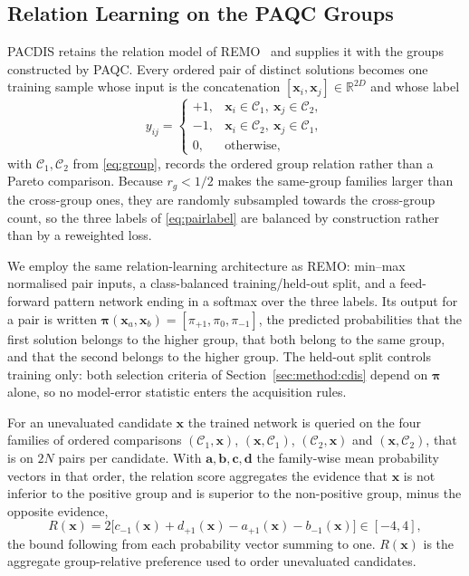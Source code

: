 \documentclass[final,5p,times,twocolumn]{elsarticle}
\newcommand{\vx}{\mathbf{x}}
\begin{document}
\subsection{Relation Learning on the PAQC Groups}
\label{sec:method:relation}

PACDIS retains the relation model of REMO~\cite{ref:remo} and supplies it
with the groups constructed by PAQC. Every ordered pair
of distinct solutions becomes one training sample whose input is the
concatenation $[\vx_i,\vx_j]\in\mathbb{R}^{2D}$ and whose label
\begin{equation}
y_{ij}=
\begin{cases}
+1, & \vx_i\in\mathcal{C}_1,\ \vx_j\in\mathcal{C}_2,\\
-1, & \vx_i\in\mathcal{C}_2,\ \vx_j\in\mathcal{C}_1,\\
0,  & \text{otherwise},
\end{cases}
\label{eq:pairlabel}
\end{equation}
with $\mathcal{C}_1,\mathcal{C}_2$ from \eqref{eq:group}, records the ordered
group relation rather than a Pareto comparison. Because $r_g<1/2$ makes the
same-group families larger than the cross-group ones, they are randomly
subsampled towards the cross-group count, so the three labels of
\eqref{eq:pairlabel} are balanced by construction rather than by a reweighted
loss.

We employ the same relation-learning architecture as REMO: min--max normalised
pair inputs, a class-balanced training/held-out split, and a feed-forward pattern
network ending in a softmax over the three labels.
Its output for a pair is written
$\bm{\pi}(\vx_a,\vx_b)=[\pi_{+1},\pi_0,\pi_{-1}]$, the predicted probabilities
that the first solution belongs to the higher group, that both belong to the
same group, and that the second belongs to the higher group. The held-out split
controls training only: both selection criteria of
Section~\ref{sec:method:cdis} depend on $\bm{\pi}$ alone, so no model-error
statistic enters the acquisition rules.

For an unevaluated candidate $\vx$ the trained network is queried on the four
families of ordered comparisons $(\mathcal{C}_1,\vx)$, $(\vx,\mathcal{C}_1)$,
$(\mathcal{C}_2,\vx)$ and $(\vx,\mathcal{C}_2)$, that is on $2N$ pairs per
candidate. With $\mathbf{a},\mathbf{b},\mathbf{c},\mathbf{d}$ the family-wise
mean probability vectors in that order, the relation score aggregates the
evidence that $\vx$ is not inferior to the positive group and is superior to the
non-positive group, minus the opposite evidence,
\begin{equation}
R(\vx)=2\bigl[c_{-1}(\vx)+d_{+1}(\vx)-a_{+1}(\vx)-b_{-1}(\vx)\bigr]
\in[-4,4],
\label{eq:relscore}
\end{equation}
the bound following from each probability vector summing to one. $R(\vx)$ is the
aggregate group-relative preference used to order unevaluated candidates.
\end{document}
